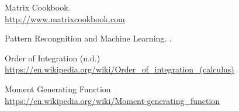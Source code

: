 \documentclass{article}
\begin{document}



\begin{thebibliography}{10}
		Matrix Cookbook. \quad
		 \\
		\href{http://www.matrixcookbook.com}{\url{http://www.matrixcookbook.com}}

		Pattern Recongnition and Machine Learning. . \quad

		Order of Integration (n.d.)
		 \\
		\href{https://en.wikipedia.org/wiki/Order_of_integration_(calculus)}{\url{https://en.wikipedia.org/wiki/Order_of_integration_(calculus)}}

		Moment Generating Function
		 \\
		\href{https://en.wikipedia.org/wiki/Moment-generating_function}{\url{https://en.wikipedia.org/wiki/Moment-generating_function}}
\end{thebibliography}
\end{document}
